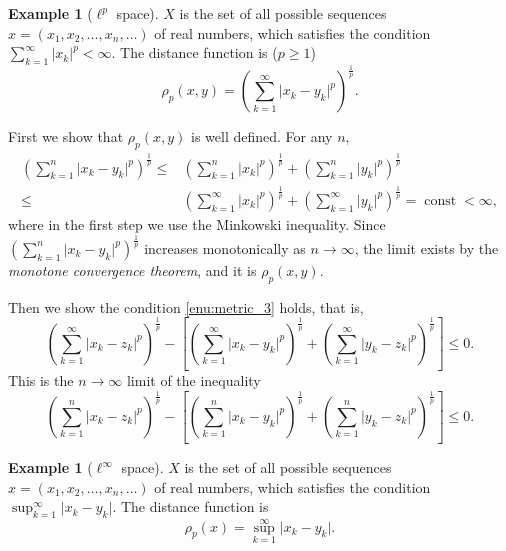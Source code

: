 \documentclass[a4paper,12pt]{article}
\theoremstyle{definition}
\newtheorem{expl}[thm]{Example}
\theoremstyle{remark}
\DeclareMathOperator{\const}{const}
\begin{document}
\begin{expl}[$\ell^p$ space]
  $X$ is the set of all possible sequences $x = (x_1, x_2, \dotsc, x_n, \dotsc)$ of real numbers, which satisfies the condition $\sum^{\infty}_{k=1} \lvert x_k \rvert^p < \infty$. The distance function is ($p \geq 1$)
  \begin{equation*}
    \rho_p(x, y) = \left( \sum^{\infty}_{k=1} \lvert x_k - y_k \rvert^p \right)^{\frac{1}{p}}.
  \end{equation*}
\end{expl}

First we show that $\rho_p(x, y)$ is well defined. For any $n$,
\begin{equation*}
  \begin{split}
    \left( \sum^n_{k=1} \lvert x_k - y_k \rvert^p \right)^{\frac{1}{p}} \leq {}& \left( \sum^n_{k=1} \lvert x_k \rvert^p \right)^{\frac{1}{p}} + \left( \sum^n_{k=1} \lvert y_k \rvert^p \right)^{\frac{1}{p}} \\
    \leq {}& \left( \sum^{\infty}_{k=1} \lvert x_k \rvert^p \right)^{\frac{1}{p}} + \left( \sum^{\infty}_{k=1} \lvert y_k \rvert^p \right)^{\frac{1}{p}} = \const < \infty,
  \end{split}
\end{equation*}
where in the first step we use the Minkowski inequality. Since $\left( \sum^n_{k=1} \lvert x_k - y_k \rvert^p \right)^{\frac{1}{p}}$ increases monotonically as $n \to \infty$, the limit exists by the \emph{monotone convergence theorem}, and it is $\rho_p(x,y)$.

Then we show the condition \ref{enu:metric_3} holds, that is,
\begin{equation*}
  \left( \sum^{\infty}_{k=1} \lvert x_k - z_k \rvert^p \right)^{\frac{1}{p}} - \left[ \left( \sum^{\infty}_{k=1} \lvert x_k - y_k \rvert^p \right)^{\frac{1}{p}} + \left( \sum^{\infty}_{k=1} \lvert y_k - z_k \rvert^p \right)^{\frac{1}{p}} \right] \leq 0.
\end{equation*}
This is the $n \to \infty$ limit of the inequality
\begin{equation*}
  \left( \sum^n_{k=1} \lvert x_k - z_k \rvert^p \right)^{\frac{1}{p}} - \left[ \left( \sum^n_{k=1} \lvert x_k - y_k \rvert^p \right)^{\frac{1}{p}} + \left( \sum^n_{k=1} \lvert y_k - z_k \rvert^p \right)^{\frac{1}{p}} \right] \leq 0.
\end{equation*}

\begin{expl}[$\ell^{\infty}$ space]
  $X$ is the set of all possible sequences $x = (x_1, x_2, \dotsc, x_n, \dotsc)$ of real numbers, which satisfies the condition $\sup^{\infty}_{k=1} \lvert x_k - y_k \rvert$. The distance function is
  \begin{equation*}
    \rho_p(x) = \sup^{\infty}_{k=1} \lvert x_k - y_k \rvert.
  \end{equation*}
\end{expl}
\end{document}
